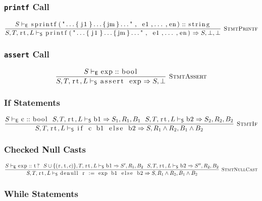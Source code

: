 \documentclass{article}
\newcommand{\code}[1]{\lstinline[columns=fixed]{#1}}
\newcommand{\drmrule}[5]{\frac{#1}{#2\vdash_{\mathsf{#3}}#4}\textsc{\ \small{#5}}}
\newcommand{\ruleapp}[1]{\vdash_{\mathsf{#1}}}
\newcommand{\mc}[1]{\textnormal{\code{#1}}}
\begin{document}
			\subsubsection{\code{printf} Call}
			
				\begin{align*}
					\drmrule{S\ruleapp{E}\mc{sprintf("...\{j1\}...\{jm\}...", e1,...,en)}::\mc{string}}{S,T,\mc{rt},L}{S}{\mc{printf("...\{j1\}...\{jm\}...", e1,...,en)} \Rightarrow S,\bot,\bot}{StmtPrintf}
				\end{align*}
				
			\subsubsection{\code{assert} Call}
			
				\begin{align*}
					\drmrule{S\ruleapp{E}\mc{exp}::\mc{bool}}{S,T,\mc{rt},L}{S}{\mc{assert exp}\Rightarrow S,\bot}{StmtAssert}
				\end{align*}
			
			\subsubsection{If Statements}
			
				\begin{align*}
					\drmrule{S\ruleapp{E}\mc{c} :: \mc{bool}\ \ S,T,\mc{rt},L\ruleapp{S}\mc{b1}\Rightarrow S_1,R_1,B_1\ \ S,T,\mc{rt},L\ruleapp{S}\mc{b2}\Rightarrow S_2,R_2,B_2}{S,T,\mc{rt},L}{S}{\mc{if c b1 else b2} \Rightarrow S,R_1\wedge R_2,B_1\wedge B_2}{StmtIf}
				\end{align*}
				
			\subsubsection{Checked Null Casts}
			
				\begin{align*}
					\drmrule{S\ruleapp{E}\mc{exp}::\mc{t?}\ \ S\cup\{(\mc{r},\mc{t},c)\},T,\mc{rt},L \ruleapp{S} \mc{b1} \Rightarrow S',R_1,B_2\ \ S,T,\mc{rt},L \ruleapp{S}\mc{b2}\Rightarrow S'',R_2,B_2}{S,T,\mc{rt},L}{S}{\mc{denull r := exp b1 else b2} \Rightarrow S,R_1\wedge R_2,B_1\wedge B_2}{StmtNullCast}
				\end{align*}
			
			\subsubsection{While Statements}
			
\end{document}
